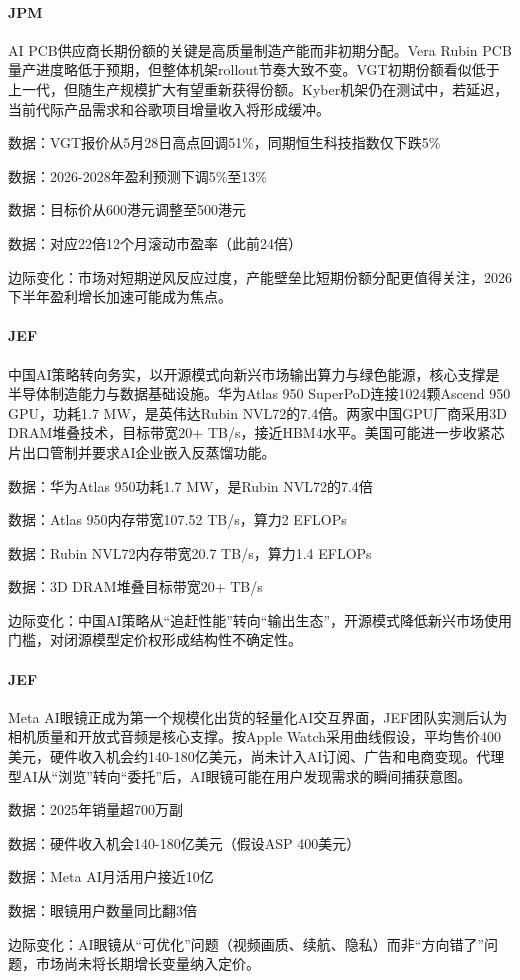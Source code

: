 \documentclass[11pt]{ctexart}
\begin{document}
\paragraph{JPM} AI PCB供应商长期份额的关键是高质量制造产能而非初期分配。Vera Rubin PCB量产进度略低于预期，但整体机架rollout节奏大致不变。VGT初期份额看似低于上一代，但随生产规模扩大有望重新获得份额。Kyber机架仍在测试中，若延迟，当前代际产品需求和谷歌项目增量收入将形成缓冲。
{\small\color{refgray}数据：VGT报价从5月28日高点回调51\%，同期恒生科技指数仅下跌5\%\par}
{\small\color{refgray}数据：2026-2028年盈利预测下调5\%至13\%\par}
{\small\color{refgray}数据：目标价从600港元调整至500港元\par}
{\small\color{refgray}数据：对应22倍12个月滚动市盈率（此前24倍）\par}
{\small\color{refgray}边际变化：市场对短期逆风反应过度，产能壁垒比短期份额分配更值得关注，2026下半年盈利增长加速可能成为焦点。\par}
\paragraph{JEF} 中国AI策略转向务实，以开源模式向新兴市场输出算力与绿色能源，核心支撑是半导体制造能力与数据基础设施。华为Atlas 950 SuperPoD连接1024颗Ascend 950 GPU，功耗1.7 MW，是英伟达Rubin NVL72的7.4倍。两家中国GPU厂商采用3D DRAM堆叠技术，目标带宽20+ TB/s，接近HBM4水平。美国可能进一步收紧芯片出口管制并要求AI企业嵌入反蒸馏功能。
{\small\color{refgray}数据：华为Atlas 950功耗1.7 MW，是Rubin NVL72的7.4倍\par}
{\small\color{refgray}数据：Atlas 950内存带宽107.52 TB/s，算力2 EFLOPs\par}
{\small\color{refgray}数据：Rubin NVL72内存带宽20.7 TB/s，算力1.4 EFLOPs\par}
{\small\color{refgray}数据：3D DRAM堆叠目标带宽20+ TB/s\par}
{\small\color{refgray}边际变化：中国AI策略从“追赶性能”转向“输出生态”，开源模式降低新兴市场使用门槛，对闭源模型定价权形成结构性不确定性。\par}
\paragraph{JEF} Meta AI眼镜正成为第一个规模化出货的轻量化AI交互界面，JEF团队实测后认为相机质量和开放式音频是核心支撑。按Apple Watch采用曲线假设，平均售价400美元，硬件收入机会约140-180亿美元，尚未计入AI订阅、广告和电商变现。代理型AI从“浏览”转向“委托”后，AI眼镜可能在用户发现需求的瞬间捕获意图。
{\small\color{refgray}数据：2025年销量超700万副\par}
{\small\color{refgray}数据：硬件收入机会140-180亿美元（假设ASP 400美元）\par}
{\small\color{refgray}数据：Meta AI月活用户接近10亿\par}
{\small\color{refgray}数据：眼镜用户数量同比翻3倍\par}
{\small\color{refgray}边际变化：AI眼镜从“可优化”问题（视频画质、续航、隐私）而非“方向错了”问题，市场尚未将长期增长变量纳入定价。\par}
\end{document}

